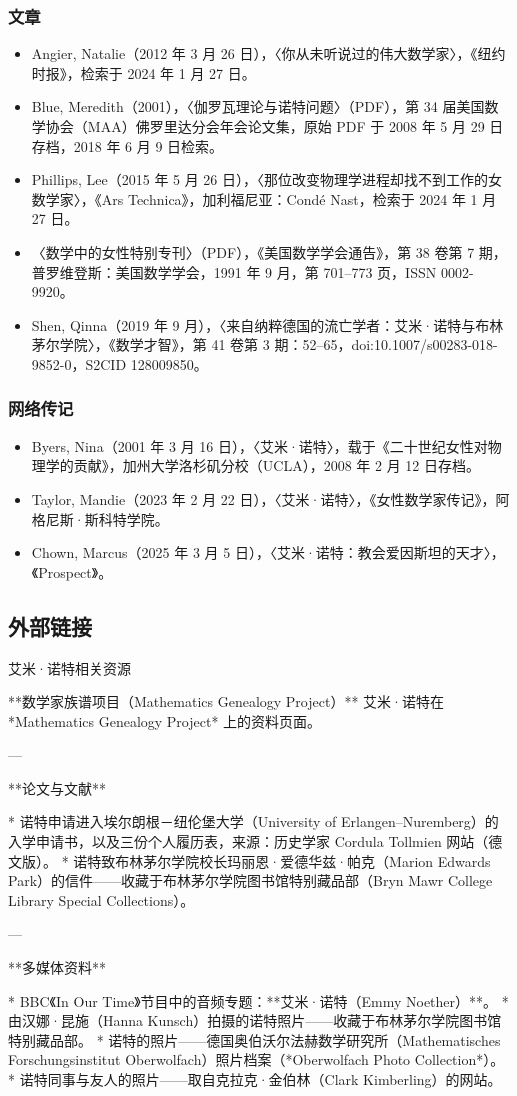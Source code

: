 \subsubsection{文章}
\begin{itemize}
\item Angier, Natalie（2012 年 3 月 26 日），〈你从未听说过的伟大数学家〉，《纽约时报》，检索于 2024 年 1 月 27 日。
\item Blue, Meredith（2001），〈伽罗瓦理论与诺特问题〉（PDF），第 34 届美国数学协会（MAA）佛罗里达分会年会论文集，原始 PDF 于 2008 年 5 月 29 日存档，2018 年 6 月 9 日检索。
\item Phillips, Lee（2015 年 5 月 26 日），〈那位改变物理学进程却找不到工作的女数学家〉，《Ars Technica》，加利福尼亚：Condé Nast，检索于 2024 年 1 月 27 日。
\item 〈数学中的女性特别专刊〉（PDF），《美国数学学会通告》，第 38 卷第 7 期，普罗维登斯：美国数学学会，1991 年 9 月，第 701–773 页，ISSN 0002-9920。
\item Shen, Qinna（2019 年 9 月），〈来自纳粹德国的流亡学者：艾米·诺特与布林茅尔学院〉，《数学才智》，第 41 卷第 3 期：52–65，doi:10.1007/s00283-018-9852-0，S2CID 128009850。
\end{itemize}
\subsubsection{网络传记}
\begin{itemize}
\item Byers, Nina（2001 年 3 月 16 日），〈艾米·诺特〉，载于《二十世纪女性对物理学的贡献》，加州大学洛杉矶分校（UCLA），2008 年 2 月 12 日存档。
\item Taylor, Mandie（2023 年 2 月 22 日），〈艾米·诺特〉，《女性数学家传记》，阿格尼斯·斯科特学院。
\item Chown, Marcus（2025 年 3 月 5 日），〈艾米·诺特：教会爱因斯坦的天才〉，《Prospect》。
\end{itemize}
\subsection{外部链接}
艾米·诺特相关资源

**数学家族谱项目（Mathematics Genealogy Project）**
艾米·诺特在 *Mathematics Genealogy Project* 上的资料页面。

---

**论文与文献**

* 诺特申请进入埃尔朗根－纽伦堡大学（University of Erlangen–Nuremberg）的入学申请书，以及三份个人履历表，来源：历史学家 Cordula Tollmien 网站（德文版）。
* 诺特致布林茅尔学院校长玛丽恩·爱德华兹·帕克（Marion Edwards Park）的信件——收藏于布林茅尔学院图书馆特别藏品部（Bryn Mawr College Library Special Collections）。

---

**多媒体资料**

* BBC《In Our Time》节目中的音频专题：**艾米·诺特（Emmy Noether）**。
* 由汉娜·昆施（Hanna Kunsch）拍摄的诺特照片——收藏于布林茅尔学院图书馆特别藏品部。
* 诺特的照片——德国奥伯沃尔法赫数学研究所（Mathematisches Forschungsinstitut Oberwolfach）照片档案（*Oberwolfach Photo Collection*）。
* 诺特同事与友人的照片——取自克拉克·金伯林（Clark Kimberling）的网站。


